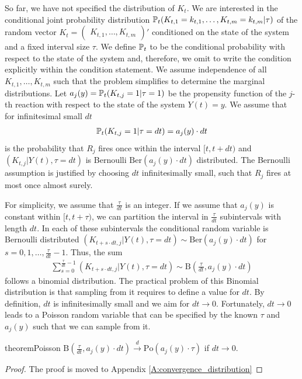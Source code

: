 So far, we have not specified the distribution of $K_t$. We are interested in the conditional joint probability distribution $\mathbb{P}_t(K_{t,1} = k_{t,1}, \dots, K_{t,m} = k_{t,m}|\tau)$ of the random vector $K_t = \begin{pmatrix}
K_{t,1}, \dots, K_{t,m} \end{pmatrix}'$ conditioned on the state of the system and a fixed interval size $\tau$. We define $\mathbb{P}_t$ to be the conditional probability with respect to the state of the system and, therefore, we omit to write the condition explicitly within the condition statement. We assume independence of all $K_{t, 1},\hdots, K_{t, m}$ such that the problem simplifies to determine the marginal distributions. Let $a_j(y) = \mathbb{P}_t(K_{t,j}=1|\tau=1)$ be the propensity function of the $j$-th reaction with respect to the state of the system $Y(t)=y$. We assume that for infinitesimal small $dt$
\begin{align}
\mathbb{P}_t(K_{t,j} = 1|\tau = dt) = a_j(y) \cdot dt
\end{align}
is the probability that $R_j$ fires once within the interval $[t, t+dt)$ and $\left(K_{t,j}|Y(t), \tau =dt \right)$ is Bernoulli $\mathrm{Ber}(a_j(y) \cdot dt)$ distributed. The Bernoulli assumption is justified by choosing $dt$ infinitesimally small, such that $R_j$ fires at most once almost surely.

For simplicity, we assume that $\frac{\tau}{dt}$ is an integer. If we assume that $a_j(y)$ is constant within $[t, t+\tau)$, we can partition the interval in $\frac{\tau}{dt}$ subintervals with length $dt$. In each of these subintervals the conditional random variable is Bernoulli distributed $\left(K_{t+s \cdot dt,j}|Y(t), \tau =dt\right) \sim \mathrm{Ber}(a_j(y) \cdot dt)$ for $s=0, 1, \dots, \frac{\tau}{dt} - 1$. Thus, the sum
\begin{align}
\sum_{s=0}^{\frac{\tau}{dt}-1} \left(K_{t+s \cdot dt, j} | Y(t), \tau = dt\right) \sim \textrm{B}\left(\frac{\tau}{dt}, a_j(y) \cdot dt\right)
\end{align}
follows a binomial distribution. The practical problem of this Binomial distribution is that sampling from it requires to define a value for $dt$. By definition, $dt$ is infinitesimally small and we aim for $dt \to 0$. Fortunately, $dt \to 0$ leads to a Poisson random variable that can be specified by the known $\tau$ and $a_j(y)$ such that we can sample from it.
\begin{restatable}{theorem}{Poisson}
$\textrm{B}\left(\frac{\tau}{dt}, a_j(y) \cdot dt\right) \xrightarrow{d} \textrm{Po}(a_j(y) \cdot \tau)$ if $dt \to 0$.
\end{restatable}
\begin{proof}
The proof is moved to Appendix \ref{A:convergence_distribution}
\end{proof}

